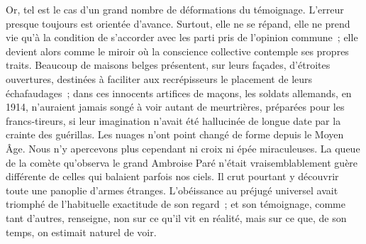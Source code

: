 \documentclass[french,twoside]{book} %
\newcommand{\astermono}{\medskip\centerline{\color{rubric}\large\selectfont{\syms ✻}}\medskip\par}%
\begin{document}
Or, tel est le cas d’un grand nombre de déformations du témoignage. L’erreur presque toujours est orientée d’avance. Surtout, elle ne se répand, elle ne prend vie qu’à la condition de s’accorder avec les parti pris de l’opinion commune ; elle devient alors comme le miroir où la conscience collective contemple ses propres traits. Beaucoup de maisons belges pré­sentent, sur leurs façades, d’étroites ouvertures, destinées à faciliter aux recrépisseurs le placement de leurs échafaudages ; dans ces innocents artifices de maçons, les soldats allemands, en 1914, n’auraient jamais songé à voir autant de meurtrières, préparées pour les francs‑tireurs, si leur imagination n’avait été hallucinée de longue date par la crainte des guérillas. Les nuages n’ont point changé de forme depuis le Moyen Âge. Nous n’y apercevons plus cependant ni croix ni épée miraculeuses. La queue de la comète qu’observa le grand Ambroise Paré n’était vraisem­blablement guère différente de celles qui balaient parfois nos ciels. Il crut pourtant y découvrir toute une panoplie d’armes étranges. L’obéissance au préjugé universel avait triomphé de l’habituelle exactitude de son regard ; et son témoignage, comme tant d’autres, renseigne, non sur ce qu’il vit en réalité, mais sur ce que, de son temps, on estimait naturel de voir.\par

\astermono
\end{document}
